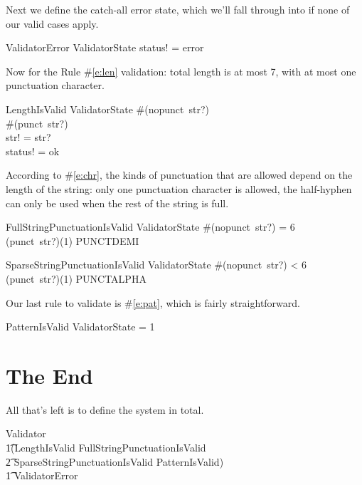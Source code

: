\documentclass[11pt]{article}
\begin{document}
\begin{spec}
  Next we define the catch-all error state, which we'll fall through into if none of our valid cases
  apply.

  \begin{schema}{ValidatorError}
    ValidatorState
    \where
    status! = error
  \end{schema}

  Now for the Rule \#\ref{e:len} validation: total length is at most 7, with at most one punctuation
  character.

  \begin{schema}{LengthIsValid}
    ValidatorState
    \where
    \#(nopunct~str?)  \\
    \#(punct~str?)  \\
    str! = str? \\
    status! = ok
  \end{schema}

  According to \#\ref{e:chr}, the kinds of punctuation that are allowed depend on the length of the
  string: only one punctuation character is allowed, the half-hyphen can only be used when the rest
  of the string is full.

  \begin{schema}{FullStringPunctuationIsValid}
    ValidatorState
    \where
    \#(nopunct~str?) = 6 \\
    (punct~str?)(1) \in PUNCTDEMI
  \end{schema}
    
  \begin{schema}{SparseStringPunctuationIsValid}
    ValidatorState
    \where
    \#(nopunct~str?) < 6 \\
    (punct~str?)(1) \in PUNCTALPHA
  \end{schema}

  Our last rule to validate is \#\ref{e:pat}, which is fairly straightforward.

  \begin{schema}{PatternIsValid}
    ValidatorState
     = 1
  \end{schema}

  \section{The End}

  All that's left is to define the system in total.

  \begin{zed}
    Validator  \\
    \t1(LengthIsValid \land FullStringPunctuationIsValid \land \\
    \t2 SparseStringPunctuationIsValid \land PatternIsValid) \lor \\
    \t1 ValidatorError
  \end{zed}
  
  
\end{spec}
\end{document}
